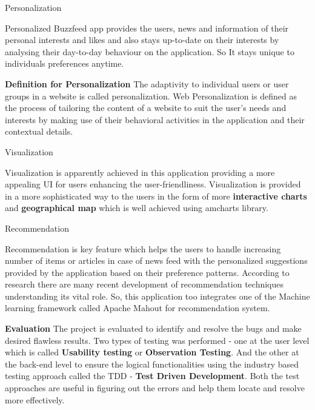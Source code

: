   
\begin{enumerate}  

 {\bf  \item  \large  Personalization} \newline
\hspace*{1cm} Personalized Buzzfeed app provides the users, news and information of their personal interests and likes and also stays up-to-date on their interests by analysing their day-to-day behaviour on the application. So It stays unique to individuals preferences anytime. \newline

{\bf Definition for Personalization} \newline
 The adaptivity to individual users or user groups in a website is called personalization. \newline
 Web Personalization is defined as the process of tailoring the content of a website to suit the user's needs and interests by making use of their behavioral activities in the application and their contextual details\cite{GARRIGOS2010991}. \newline
 
 
 
 {\bf  \item \large  Visualization}  \newline
\hspace*{1cm} Visualization is apparently achieved in this application providing a more appealing UI for users enhancing the user-friendliness. Visualization is provided in a more sophisticated way to the users in the form of more \textbf{interactive charts} and \textbf{geographical map} which is well achieved using amcharts library. \newline

{\bf  \item \large  Recommendation}  \newline
\hspace*{1cm} Recommendation is key feature which helps the users to handle increasing number of items or articles in case of news feed with the personalized suggestions provided by the application based on their preference patterns. According to research there are many recent development of recommendation techniques understanding its vital role. So, this application too integrates one of the Machine learning framework called Apache Mahout for recommendation system\cite{LU201512}.
\end{enumerate}  

{\bf \large  Evaluation}  \newline
The project is evaluated to identify and resolve the bugs and make desired flawless results.
Two types of testing was performed - one at the user level which is called\textbf{ Usability testing} or \textbf{Observation Testing}. And the other at the back-end level to ensure the logical functionalities using the industry based testing approach called the TDD -\textbf{ Test Driven Development}.
Both the test approaches are useful in figuring out the errors and help them locate and resolve more effectively.

